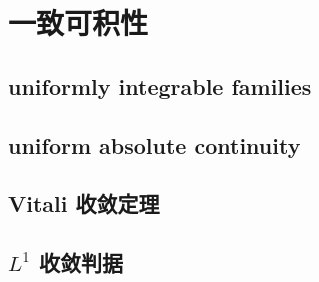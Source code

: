 \section{一致可积性}
\label{b1:sec:0505}


\subsection{uniformly integrable families}
\label{b1:subsec:050501}

\subsection{uniform absolute continuity}
\label{b1:subsec:050502}

\subsection{Vitali 收敛定理}
\label{b1:subsec:050503}

\subsection{\texorpdfstring{\(L^1\)}{L1} 收敛判据}
\label{b1:subsec:050504}


